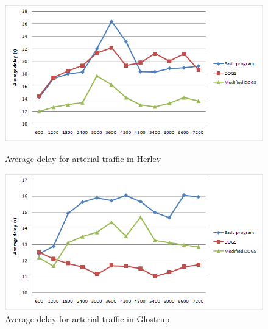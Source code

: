 \begin{figure}[ht]

    \begin{minipage}[b]{0.5\linewidth}

\begin{center}
\includegraphics[scale=0.25]{delay_arterial_herlev.png} 
\end{center}
\caption{Average delay for arterial traffic in Herlev}
\label{fig:delay_arterial_herlev}

    \end{minipage}
    \hspace{0.5cm}
    \begin{minipage}[b]{0.5\linewidth}

\begin{center}
\includegraphics[scale=0.25]{delay_arterial_glostrup.PNG} 
\end{center}
\caption{Average delay for arterial traffic in Glostrup}
\label{fig:delay_arterial_glostrup}

    \end{minipage}
    
        \begin{minipage}[b]{0.5\linewidth}


\end{minipage}
\end{figure}
